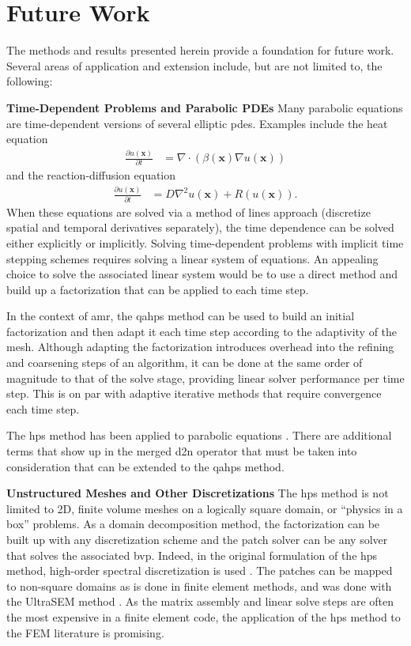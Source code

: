 \section{Future Work}
\label{sec:future-work}

The methods and results presented herein provide a foundation for future work. Several areas of application and extension include, but are not limited to, the following:

{\bf Time-Dependent Problems and Parabolic PDEs}
Many parabolic equations are time-dependent versions of several elliptic \gls{pdes}. Examples include the heat equation
\begin{align}
    \frac{\partial u(\textbf{x})}{\partial t} &= \nabla \cdot \left( \beta(\textbf{x}) \nabla u(\textbf{x}) \right)
\end{align}
and the reaction-diffusion equation
\begin{align}
    \frac{\partial u(\textbf{x})}{\partial t} &= D \nabla^2 u(\textbf{x}) + R(u(\textbf{x})).
\end{align}
When these equations are solved via a method of lines approach (discretize spatial and temporal derivatives separately), the time dependence can be solved either explicitly or implicitly. Solving time-dependent problems with implicit time stepping schemes requires solving a linear system of equations. An appealing choice to solve the associated linear system would be to use a direct method and build up a factorization that can be applied to each time step.

In the context of \gls{amr}, the \gls{qahps} method can be used to build an initial factorization and then adapt it each time step according to the adaptivity of the mesh. Although adapting the factorization introduces overhead into the refining and coarsening steps of an algorithm, it can be done at the same order of magnitude to that of the solve stage, providing linear solver performance per time step. This is on par with adaptive iterative methods that require convergence each time step.

The \gls{hps} method has been applied to parabolic equations \citep{babb2018hps}. There are additional terms that show up in the merged \gls{d2n} operator that must be taken into consideration that can be extended to the \gls{qahps} method.

{\bf Unstructured Meshes and Other Discretizations}
The \gls{hps} method is not limited to 2D, finite volume meshes on a logically square domain, or ``physics in a box'' problems. As a domain decomposition method, the factorization can be built up with any discretization scheme and the patch solver can be any solver that solves the associated \gls{bvp}. Indeed, in the original formulation of the \gls{hps} method, high-order spectral discretization is used \citep{gillman2014direct}. The patches can be mapped to non-square domains as is done in finite element methods, and was done with the UltraSEM method \citep{fortunato2020ultraspherical}. As the matrix assembly and linear solve steps are often the most expensive in a finite element code, the application of the \gls{hps} method to the FEM literature is promising.

